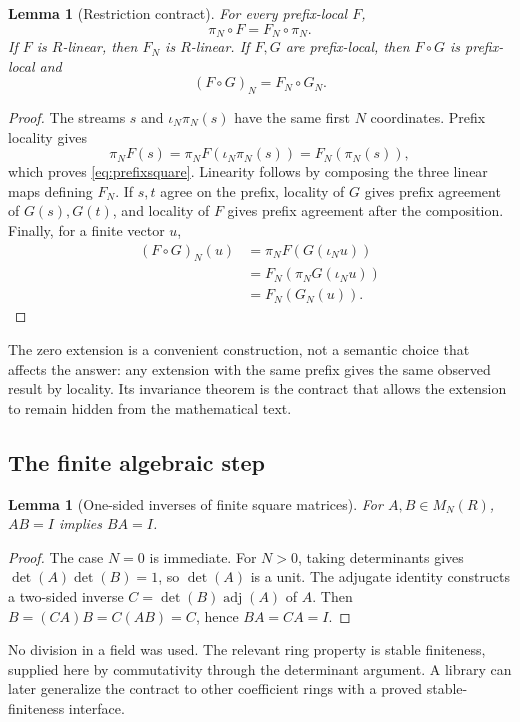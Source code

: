 \documentclass[11pt,a4paper]{article}
\theoremstyle{plain}
\newtheorem{lemma}[theorem]{Lemma}
\theoremstyle{definition}
\begin{document}
\begin{lemma}[Restriction contract]
For every prefix-local $F$,
\begin{equation}
 \pi_N\circ F=F_N\circ\pi_N.\label{eq:prefixsquare}
\end{equation}
If $F$ is $R$-linear, then $F_N$ is $R$-linear. If $F,G$ are prefix-local, then $F\circ G$ is prefix-local and
\[
 (F\circ G)_N=F_N\circ G_N.
\]
\end{lemma}
\begin{proof}
The streams $s$ and $\iota_N\pi_N(s)$ have the same first $N$ coordinates. Prefix locality gives
\[
 \pi_NF(s)=\pi_NF(\iota_N\pi_N(s))=F_N(\pi_N(s)),
\]
which proves \eqref{eq:prefixsquare}. Linearity follows by composing the three linear maps defining $F_N$. If $s,t$ agree on the prefix, locality of $G$ gives prefix agreement of $G(s),G(t)$, and locality of $F$ gives prefix agreement after the composition. Finally, for a finite vector $u$,
\begin{align*}
 (F\circ G)_N(u)
 &=\pi_N F(G(\iota_Nu))\\
 &=F_N(\pi_NG(\iota_Nu))\\
 &=F_N(G_N(u)).
\end{align*}
\end{proof}
The zero extension is a convenient construction, not a semantic choice that affects the answer: any extension with the same prefix gives the same observed result by locality. Its invariance theorem is the contract that allows the extension to remain hidden from the mathematical text.

\subsection{The finite algebraic step}
\begin{lemma}[One-sided inverses of finite square matrices]
For $A,B\in M_N(R)$, $AB=I$ implies $BA=I$.
\end{lemma}
\begin{proof}
The case $N=0$ is immediate. For $N>0$, taking determinants gives
$\det(A)\det(B)=1$, so $\det(A)$ is a unit. The adjugate identity constructs a two-sided inverse
$C=\det(B)\operatorname{adj}(A)$ of $A$. Then
$B=(CA)B=C(AB)=C$, hence $BA=CA=I$.
\end{proof}
No division in a field was used. The relevant ring property is stable finiteness, supplied here by commutativity through the determinant argument. A library can later generalize the contract to other coefficient rings with a proved stable-finiteness interface.
\end{document}
